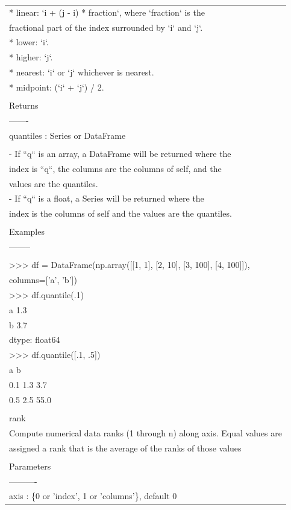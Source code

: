 \documentclass[11pt]{article}
\begin{document}
\begin{enumerate}
\begin{enumerate}
\begin{enumerate}
\begin{center}
\begin{tabular}{l}
\\
* linear: `i + (j - i) * fraction`, where `fraction` is the\\
fractional part of the index surrounded by `i` and `j`.\\
* lower: `i`.\\
* higher: `j`.\\
* nearest: `i` or `j` whichever is nearest.\\
* midpoint: (`i` + `j`) / 2.\\
\\
Returns\\
-------\\
quantiles : Series or DataFrame\\
\\
- If ``q`` is an array, a DataFrame will be returned where the\\
index is ``q``, the columns are the columns of self, and the\\
values are the quantiles.\\
- If ``q`` is a float, a Series will be returned where the\\
index is the columns of self and the values are the quantiles.\\
\\
Examples\\
--------\\
\\
>>> df = DataFrame(np.array([[1, 1], [2, 10], [3, 100], [4, 100]]),\\
columns=['a', 'b'])\\
>>> df.quantile(.1)\\
a    1.3\\
b    3.7\\
dtype: float64\\
>>> df.quantile([.1, .5])\\
a     b\\
0.1  1.3   3.7\\
0.5  2.5  55.0\\
\\
rank\\
Compute numerical data ranks (1 through n) along axis. Equal values are\\
assigned a rank that is the average of the ranks of those values\\
\\
Parameters\\
----------\\
axis : \{0 or 'index', 1 or 'columns'\}, default 0\\

\end{tabular}
\end{center}
\end{enumerate}
\end{enumerate}
\end{enumerate}
\end{document}
